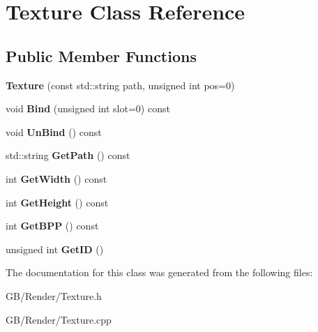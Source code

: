 \hypertarget{class_texture}{}\section{Texture Class Reference}
\label{class_texture}
\subsection*{Public Member Functions}
\begin{DoxyCompactItemize}
\item 
\mbox{\label{class_texture_aaaafec20e9c3632a30eb06a4c2dbc301}} 
{\bfseries Texture} (const std\+::string path, unsigned int pos=0)
\item 
\mbox{\label{class_texture_a14a2a70d9f130ac91a5ac95c8a4c7831}} 
void {\bfseries Bind} (unsigned int slot=0) const
\item 
\mbox{\label{class_texture_a592f9af5f52fc4a45094561f1b62a36e}} 
void {\bfseries Un\+Bind} () const
\item 
\mbox{\label{class_texture_a6033f54fcaa754471cf971acb3e03569}} 
std\+::string {\bfseries Get\+Path} () const
\item 
\mbox{\label{class_texture_a7f5ee18c7466f904fa371bd97399a944}} 
int {\bfseries Get\+Width} () const
\item 
\mbox{\label{class_texture_a289701837e23c9272509f377524ee8f2}} 
int {\bfseries Get\+Height} () const
\item 
\mbox{\label{class_texture_afd308fae28f7a6cbec287b77934afaa9}} 
int {\bfseries Get\+B\+PP} () const
\item 
\mbox{\label{class_texture_a0c0e6cfba4b3808eaabd9ed891132da3}} 
unsigned int {\bfseries Get\+ID} ()
\end{DoxyCompactItemize}


The documentation for this class was generated from the following files\+:\begin{DoxyCompactItemize}
\item 
G\+B/\+Render/Texture.\+h\item 
G\+B/\+Render/Texture.\+cpp\end{DoxyCompactItemize}
